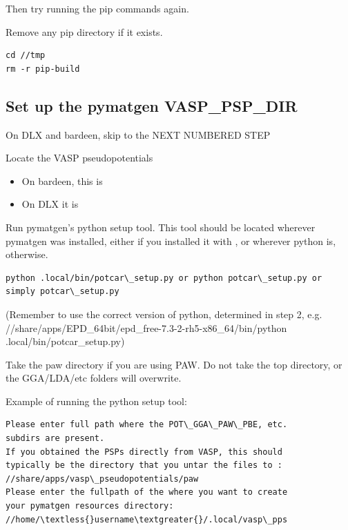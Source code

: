 \documentclass[letterpaper,10pt,english]{sphinxmanual}
\begin{document}
Then try running the pip commands again.

Remove any pip directory if it exists.

\begin{Verbatim}[commandchars=\\\{\}]
cd //tmp
rm -r pip-build
\end{Verbatim}


\subsection{Set up the pymatgen VASP\_PSP\_DIR}
\label{1_0_installation:set-up-the-pymatgen-vasp-psp-dir}
On DLX and bardeen, skip to the NEXT NUMBERED STEP

Locate the VASP pseudopotentials
\begin{itemize}
\item {} 
On bardeen, this is 

\item {} 
On DLX it is 

\end{itemize}

Run pymatgen's python setup tool. This tool should be located wherever pymatgen was installed, either  if you installed it with , or wherever python is, otherwise.

\begin{Verbatim}[commandchars=\\\{\}]
python .local/bin/potcar\_setup.py or python potcar\_setup.py or simply potcar\_setup.py
\end{Verbatim}

(Remember to use the correct version of python, determined in step 2, e.g. //share/apps/EPD\_64bit/epd\_free-7.3-2-rh5-x86\_64/bin/python .local/bin/potcar\_setup.py)

Take the paw directory if you are using PAW. Do not take the top directory, or the GGA/LDA/etc folders will overwrite.

Example of running the python setup tool:

\begin{Verbatim}[commandchars=\\\{\}]
Please enter full path where the POT\_GGA\_PAW\_PBE, etc.
subdirs are present.
If you obtained the PSPs directly from VASP, this should
typically be the directory that you untar the files to :
//share/apps/vasp\_pseudopotentials/paw
Please enter the fullpath of the where you want to create
your pymatgen resources directory:
//home/\textless{}username\textgreater{}/.local/vasp\_pps
\end{Verbatim}
\end{document}
